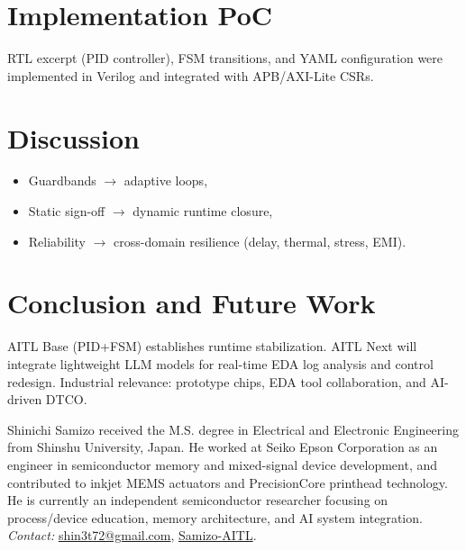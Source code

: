 \documentclass[journal]{IEEEtran} %
\begin{document}
\section{Implementation PoC}
RTL excerpt (PID controller), FSM transitions, and YAML configuration were implemented in Verilog and integrated with APB/AXI-Lite CSRs.

\section{Discussion}
\begin{itemize}
  \item Guardbands $\rightarrow$ adaptive loops,
  \item Static sign-off $\rightarrow$ dynamic runtime closure,
  \item Reliability $\rightarrow$ cross-domain resilience (delay, thermal, stress, EMI).
\end{itemize}

\section{Conclusion and Future Work}
AITL Base (PID+FSM) establishes runtime stabilization.
AITL Next will integrate lightweight LLM models for real-time EDA log analysis and control redesign.
Industrial relevance: prototype chips, EDA tool collaboration, and AI-driven DTCO.

\nocite{yakimets2020cfet,irds2023,franklin2015feedback,khalil2002nonlinear,anderson2007optimal,iec61000}




\begin{IEEEbiographynophoto}{Shinichi Samizo}
received the M.S. degree in Electrical and Electronic Engineering from Shinshu University, Japan. He worked at Seiko Epson Corporation as an engineer in semiconductor memory and mixed-signal device development, and contributed to inkjet MEMS actuators and PrecisionCore printhead technology. He is currently an independent semiconductor researcher focusing on process/device education, memory architecture, and AI system integration. \emph{Contact:} \href{mailto:shin3t72@gmail.com}{shin3t72@gmail.com}, \href{https://github.com/Samizo-AITL}{Samizo-AITL}.
\end{IEEEbiographynophoto}
\end{document}
